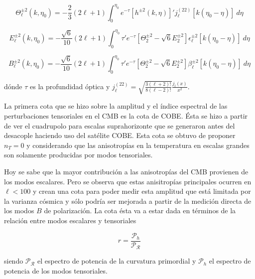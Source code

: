 \begin{equation}
    \Theta_\ell^{\pm 2} (k, \eta_0) = - \frac{2}{3} (2 \ell + 1) \int_0^{\eta_0} e^{- \tau} \left[ h^{\pm 2} \left( k, \eta \right) \right]' j_\ell^{(22)} \left[ k \left( \eta_0 - \eta \right) \right] \ d\eta 
\end{equation}

\begin{equation}
    E_\ell^{\pm 2} (k, \eta_0) = - \frac{\sqrt{6}}{10} (2 \ell + 1) \int_0^{\eta_0} \tau' e^{- \tau} \left[ \Theta_2^{\pm 2} - \sqrt{6} E_2^{\pm 2} \right] \epsilon_\ell^{\pm 2} \left[ k \left( \eta_0 - \eta \right) \right] \ d\eta
\end{equation}

\begin{equation}
    B_\ell^{\pm 2} (k, \eta_0) = - \frac{\sqrt{6}}{10} (2 \ell + 1) \int_0^{\eta_0} \tau' e^{- \tau} \left[ \Theta_2^{\pm 2} - \sqrt{6} E_2^{\pm 2} \right] \beta_\ell^{\pm 2} \left[ k \left( \eta_0 - \eta \right) \right] \ d\eta
\end{equation}

\noindent
dónde $\tau$ es la profundidad óptica y $\displaystyle j^{(22)}_\ell = \sqrt{\frac{3 (\ell + 2)!}{8 (\ell - 2)!}} \frac{j_l (x)}{x^2}$.

La primera cota que se hizo sobre la amplitud y el índice espectral de las perturbaciones tensoriales en el CMB es la cota de COBE. Ésta se hizo a partir de ver el cuadrupolo para escalas suprahorizonte que se generaron antes del desacople haciendo uso del satélite COBE. Esta cota se obtuvo de proponer $n_T = 0$ y considerando que las anisotropías en la temperatura en escalas grandes son solamente producidas por modos tensoriales.

Hoy se sabe que la mayor contribución a las anisotropías del CMB provienen de los modos escalares. Pero se observa que estas anisitropías principales ocurren en $\ell < 100$ y crean una cota para poder medir esta amplitud que está limitada por la varianza cósmica y sólo podría ser mejorada a partir de la medición directa de los modos $B$ de polarización. La cota ésta va a estar dada en términos de la relación entre modos escalares y tensoriales 

\begin{equation}
    r = \frac{\mathcal{P}_h} {\mathcal{P}_\mathcal{R}}
\end{equation}

\noindent
siendo $\mathcal{P}_\mathcal{R}$ el espectro de potencia de la curvatura primordial y $\mathcal{P}_h$ el espectro de potencia de los modos tensoriales.

